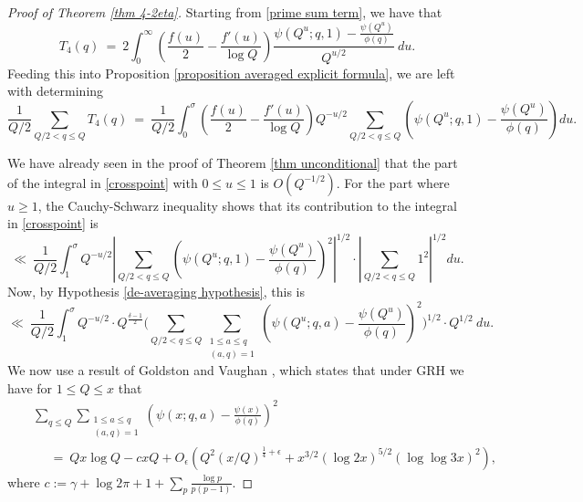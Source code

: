 \documentclass[12pt,reqno]{amsart}
\numberwithin{equation}{section}
\theoremstyle{plain}
\begin{document}
\begin{proof}[Proof of Theorem \ref{thm 4-2eta}] Starting from \eqref{prime sum term}, we have that
\begin{equation} T_4(q) \ = \ 2 \int_0^{\infty} \left(\frac {f(u)}2 -\frac {f'(u)}{\log Q}\right)\frac{\psi(Q^u;q,1)-\frac{\psi(Q^u)}{\phi(q)}}{Q^{u/2}}\ du.  \end{equation} Feeding this into Proposition \ref{proposition averaged explicit formula}, we are left with determining
\begin{equation}\label{crosspoint}
\frac1{Q/2}\sum_{Q/2<q\leq Q} T_4(q) \ = \ \frac1{Q/2}\int_0^{\sigma} \left(\frac {f(u)}2 -\frac {f'(u)}{\log Q}\right)Q^{-u/2}\sum_{Q/2<q\leq Q} \left(\psi(Q^u;q,1)-\frac{\psi(Q^u)}{\phi(q)} \right) du.
\end{equation}

We have already seen in the proof of Theorem \ref{thm unconditional} that the part of the integral in \eqref{crosspoint} with $0\leq u\leq 1$ is
$O(Q^{-1/2})$. For the part where $u\geq 1$, the Cauchy-Schwarz inequality shows that its contribution to the integral in \eqref{crosspoint} is
\begin{equation} \ll\ \frac1{Q/2}\int_1^{\sigma} Q^{-u/2} \left| \sum_{Q/2<q\leq Q} \left(\psi(Q^u;q,1)-\frac{\psi(Q^u)}{\phi(q)} \right)^2 \right|^{1/2} \cdot \left| \sum_{Q/2<q\leq Q} 1^2 \right|^{1/2}  du. \end{equation}
Now, by Hypothesis \ref{de-averaging hypothesis}, this is
\begin{equation} \ll\ \frac1{Q/2}\int_1^{\sigma} Q^{-u/2} \cdot Q^{\frac{\delta-1}2}\Bigg(\sum_{Q/2<q\leq Q} \sum_{\substack{1\leq a\leq q \\ (a,q)=1}}\left(\psi(Q^u;q,a)-\frac{\psi(Q^u)}{\phi(q)} \right)^2 \Bigg)^{1/2} \cdot Q^{1/2}\ du.
\label{equation where the variance appears}
\end{equation}
We now use a result of Goldston and Vaughan \cite{GV}, which states that under GRH we have for $1\leq Q\leq x$ that
\begin{eqnarray} & & \sum_{q\leq Q} \sum_{\substack{1\leq a\leq q \\ (a,q)=1}}\left(\psi(x;q,a)-\frac{\psi(x)}{\phi(q)} \right)^2  \nonumber\\ & & \ \ \ \ \ \ =\ Qx\log Q-cxQ + O_{\epsilon}\left( Q^2(x/Q)^{\frac 14+\epsilon}+x^{3/2} (\log 2x)^{5/2} (\log\log 3x)^2\right),
\label{equation GV}
\end{eqnarray}
where $c:=\gamma+\log 2\pi +1 +\sum_p \frac{\log p}{p(p-1)}$.


\end{proof}
\end{document}
